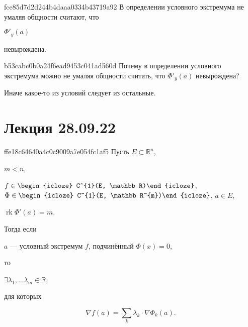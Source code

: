 \begin{note}{fce85d7d2d244b4daaa0334b43719a92}
    В определении условного экстремума не умаляя общности считают, что \begin{icloze}{2}\({ \Phi'_y(a) }\)\end{icloze} \begin{icloze}{1}невырождена.\end{icloze}
\end{note}

\begin{note}{b53cabc0b0a24f6ead9453c041ad560d}
    Почему в определении условного экстремума можно не умаляя общности считать, что \({ \Phi'_y(a) }\) невырождена?

    \begin{cloze}{1}
        Иначе какое-то из условий следует из остальные.
    \end{cloze}
\end{note}

\section{Лекция 28.09.22}
\begin{note}{ffe18c64640a4c0c9009a7e054fc1af5}
    Пусть \({ E \subset \mathbb R^{n} }\), \begin{icloze}{6}\({ m < n }\),\end{icloze} \({ f \in \begin{icloze}{4}C^{1}(E, \mathbb R)\end{icloze} }\), \({ \Phi \in \begin{icloze}{4}C^{1}(E, \mathbb R^{m})\end{icloze} }\), \({ a \in E }\), \begin{icloze}{5}\({ \operatorname{rk} \Phi'(a) = m }\).\end{icloze}
    Тогда если \begin{icloze}{3}\({ a }\) --- условный экстремум \({ f }\), подчинённый \({ \Phi(x) = 0 }\),\end{icloze} то \begin{icloze}{2}\({ \exists \lambda_1, \ldots \lambda_m \in \mathbb R }\),\end{icloze} для которых
    \begin{icloze}{1}
        \[
            \nabla f(a) = \sum_{k} \lambda_k \cdot \nabla \Phi_k(a).
        \]
    \end{icloze}
\end{note}

